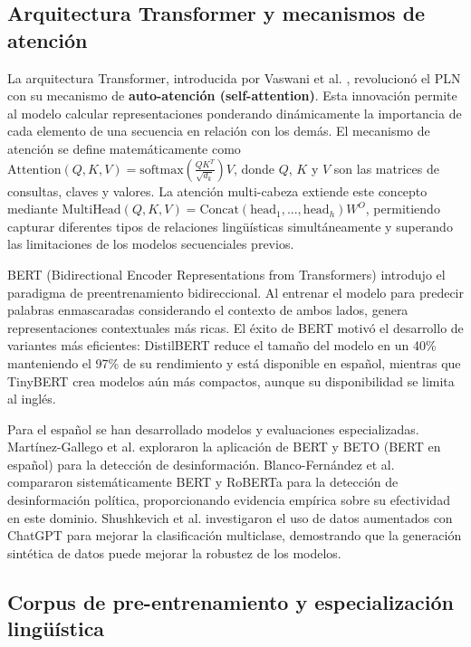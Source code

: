 \subsection{Arquitectura Transformer y mecanismos de atención}

La arquitectura Transformer, introducida por Vaswani et al. \cite{vaswani2017attention}, revolucionó el PLN con su mecanismo de \textbf{auto-atención (self-attention)}. Esta innovación permite al modelo calcular representaciones ponderando dinámicamente la importancia de cada elemento de una secuencia en relación con los demás. El mecanismo de atención se define matemáticamente como $\text{Attention}(Q,K,V) = \text{softmax}\left(\frac{QK^T}{\sqrt{d_k}}\right)V$, donde $Q$, $K$ y $V$ son las matrices de consultas, claves y valores. La atención multi-cabeza extiende este concepto mediante $\text{MultiHead}(Q,K,V) = \text{Concat}(\text{head}_1, ..., \text{head}_h)W^O$, permitiendo capturar diferentes tipos de relaciones lingüísticas simultáneamente y superando las limitaciones de los modelos secuenciales previos.

BERT (Bidirectional Encoder Representations from Transformers) \cite{devlin2018bert} introdujo el paradigma de preentrenamiento bidireccional. Al entrenar el modelo para predecir palabras enmascaradas considerando el contexto de ambos lados, genera representaciones contextuales más ricas. El éxito de BERT motivó el desarrollo de variantes más eficientes: DistilBERT \cite{sanh2019distilbert} reduce el tamaño del modelo en un 40\% manteniendo el 97\% de su rendimiento y está disponible en español, mientras que TinyBERT \cite{jiao2019tinybert} crea modelos aún más compactos, aunque su disponibilidad se limita al inglés.

Para el español se han desarrollado modelos y evaluaciones especializadas. Martínez-Gallego et al. \cite{martinez2021fake} exploraron la aplicación de BERT y BETO (BERT en español) para la detección de desinformación. Blanco-Fernández et al. \cite{blanco2024enhancing} compararon sistemáticamente BERT y RoBERTa para la detección de desinformación política, proporcionando evidencia empírica sobre su efectividad en este dominio. Shushkevich et al. \cite{shushkevich2023improving} investigaron el uso de datos aumentados con ChatGPT para mejorar la clasificación multiclase, demostrando que la generación sintética de datos puede mejorar la robustez de los modelos.

\subsection{Corpus de pre-entrenamiento y especialización lingüística}

